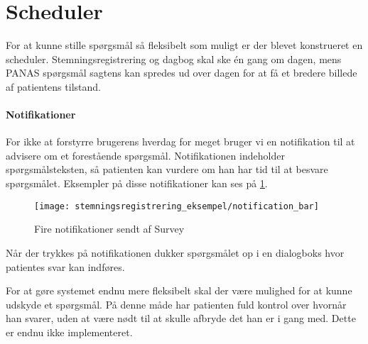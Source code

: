 \section{Scheduler}
For at kunne stille spørgsmål så fleksibelt som muligt er der blevet konstrueret en scheduler.
Stemningsregistrering og dagbog skal ske én gang om dagen, mens PANAS spørgsmål sagtens kan spredes ud over dagen for at få et bredere billede af patientens tilstand.


\paragraph{Notifikationer}
For ikke at forstyrre brugerens hverdag for meget bruger vi en notifikation til at advisere om et forestående spørgsmål.
Notifikationen indeholder spørgsmålsteksten, så patienten kan vurdere om han har tid til at besvare spørgsmålet.
Eksempler på disse notifikationer kan ses på \cref{noti}.

\begin{figure}
	\centering
	\texttt{[image: stemningsregistrering\_eksempel/notification\_bar]}
	\caption{Fire notifikationer sendt af Survey}\label{noti}
\end{figure}

Når der trykkes på notifikationen dukker spørgsmålet op i en dialogboks hvor patientes svar kan indføres.

For at gøre systemet endnu mere fleksibelt skal der være mulighed for at kunne udskyde et spørgsmål.
På denne måde har patienten fuld kontrol over hvornår han svarer, uden at være nødt til at skulle afbryde det han er i gang med.
Dette er endnu ikke implementeret.